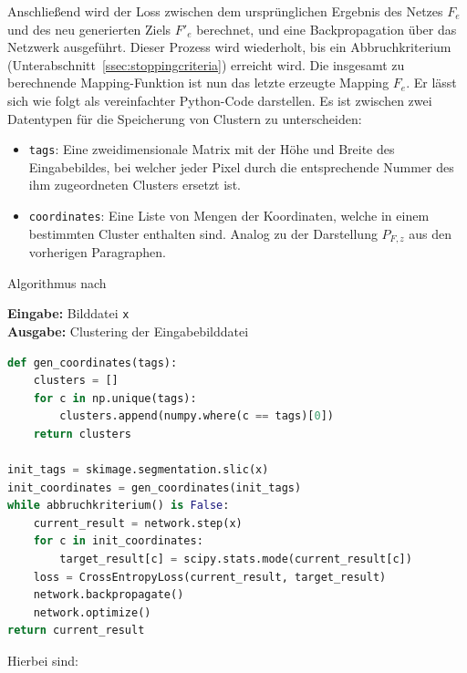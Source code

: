 

Anschließend wird der Loss zwischen dem ursprünglichen Ergebnis des Netzes $F_e$ und des neu generierten Ziels $F'_e$ berechnet, und eine Backpropagation über das Netzwerk ausgeführt. Dieser Prozess wird wiederholt, bis ein Abbruchkriterium (\vgl Unterabschnitt~\ref{ssec:stoppingcriteria}) erreicht wird. Die insgesamt zu berechnende Mapping-Funktion ist nun das letzte erzeugte Mapping $F_e$. Er lässt sich wie folgt als vereinfachter Python-Code darstellen. Es ist zwischen zwei Datentypen für die Speicherung von Clustern zu unterscheiden:

\begin{itemize}
	\item{\lstinline[columns=fixed]{tags}:} Eine zweidimensionale Matrix mit der Höhe und Breite des Eingabebildes, bei welcher jeder Pixel durch die entsprechende Nummer des ihm zugeordneten Clusters ersetzt ist.
	\item{\lstinline[columns=fixed]{coordinates}:} Eine Liste von Mengen der Koordinaten, welche in einem bestimmten Cluster enthalten sind. Analog zu der Darstellung $P_{F,z}$ aus den vorherigen Paragraphen.
\end{itemize}

\begin{algorithm}[H]
\caption{Algorithmus nach \cite{kanezaki_18}}
\textbf{Eingabe:} Bilddatei \lstinline[columns=fixed]{x}\\
\textbf{Ausgabe:} Clustering der Eingabebilddatei 
\begin{lstlisting}[language=Python]
def gen_coordinates(tags):
	clusters = []
	for c in np.unique(tags):
		clusters.append(numpy.where(c == tags)[0])
	return clusters

init_tags = skimage.segmentation.slic(x)
init_coordinates = gen_coordinates(init_tags)
while abbruchkriterium() is False:
	current_result = network.step(x)
	for c in init_coordinates:
		target_result[c] = scipy.stats.mode(current_result[c])
	loss = CrossEntropyLoss(current_result, target_result)
	network.backpropagate()
	network.optimize()
return current_result
\end{lstlisting}
\end{algorithm}

Hierbei sind:

